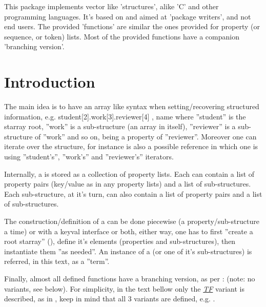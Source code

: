 \documentclass[10pt]{article}
\begin{document}
  
\begin{typesetabstract}

This package implements vector like 'structures', alike 'C' and other programming languages. 
It's based on  and aimed at 'package writers', and not end users. The provided 'functions' are similar the ones provided for property (or sequence, or token) lists. Most of the provided functions have a companion 'branching version'.

\end{typesetabstract}

\tableofcontents

\section{Introduction}
The main idea is to have an array like syntax when setting/recovering structured information, e.g.  {student[2].work[3].reviewer[4] , name} where ''student'' is the starray root, ''work'' is a sub-structure (an array in itself), ''reviewer'' is a sub-structure of ''work'' and so on,  being a property of ''reviewer''. Moreover one can iterate over the structure, for instance  is also a possible reference in which one is using ''student's'', ''work's'' and ''reviewer's'' iterators.

Internally, a  is stored as a collection of property lists. Each  can contain a list of property pairs (key/value as in any  property lists) and a list of sub-structures. Each sub-structure, at it's turn, can also contain a list of property pairs and a list of sub-structures. 

The construction/definition of a  can be done piecewise (a property/sub-structure a time) or with a keyval interface or both, either way, one has to first ''create a root starray'' (), define it's elements (properties and sub-structures), then instantiate them ''as needed''. An instance of a  (or one of it's sub-structures) is referred, in this text, as a ''term''.

Finally, almost all defined functions have a branching version, as per :  (note: no  variants, see below). For simplicity, in the text bellow only the \underline{\textsl{TF}} variant is described, as in , keep in mind that all 3 variants are defined, e.g. .
\end{document}
